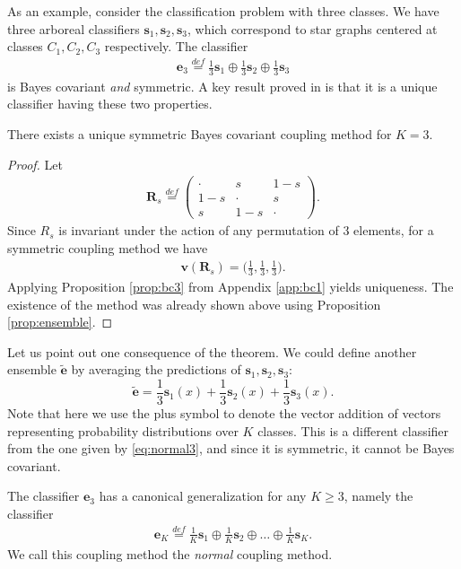 As an example, consider the classification problem with three classes. We have three arboreal classifiers $\boldsymbol{s}_1, \boldsymbol{s}_2, \boldsymbol{s}_3$, which correspond to star graphs centered  at classes $C_1, C_2, C_3$ respectively. The classifier 
\begin{align}
\boldsymbol{e}_3 \stackrel{def}{=} \frac13 \boldsymbol{s}_1 \oplus \frac13 \boldsymbol{s}_2 \oplus \frac 13 \boldsymbol{s}_3  \label{eq:normal3}
\end{align}
is Bayes covariant \emph{and} symmetric. A key result proved in \cite{vsuch2016bayes} is that it is a unique  classifier having these two properties.

\begin{thm} \label{thm:K3}
	There exists a unique symmetric Bayes covariant coupling method for $K=3$.
\end{thm}

\begin{proof}
Let 
\begin{align}
	\boldsymbol{R}_s \stackrel{def}{=} \begin{pmatrix} \cdot & s & 1 -s \\  1-s & \cdot & s \\ s & 1-s & \cdot \end{pmatrix}.
\end{align}
Since $R_s$ is invariant under the action of any permutation of 3 elements, 
for a symmetric coupling method we have 
\begin{align}
	\boldsymbol{v} (\boldsymbol{R}_s) = \biggl(\frac 13, \frac 13, \frac 13 \biggr).
\end{align}
Applying  Proposition \ref{prop:bc3} from Appendix \ref{app:bc1} yields uniqueness. The existence of the method was already shown above using Proposition \ref{prop:ensemble}.
\end{proof}


Let us point out one consequence of the theorem. We could define another ensemble $\tilde{\boldsymbol{e}}$ by averaging the predictions of $\boldsymbol{s}_1, \boldsymbol{s}_2, \boldsymbol{s}_3$:
\[
\tilde{\boldsymbol{e}} = \frac13 \boldsymbol{s}_1(x) + \frac13 \boldsymbol{s}_2(x) + \frac 13 \boldsymbol{s}_3(x).
\]
Note that here we use the plus symbol to denote the vector addition of vectors representing  probability distributions over $K$ classes. This is a different classifier from the one given by  \eqref{eq:normal3}, and since it is symmetric, it cannot be Bayes covariant.

The classifier $\boldsymbol{e}_3$ has a canonical generalization for any $K\geq 3$, namely the classifier
\begin{align}
\boldsymbol{e}_K \stackrel{def}{=} \frac1K \boldsymbol{s}_1 \oplus \frac1K \boldsymbol{s}_2 \oplus \ldots \oplus \frac 1K \boldsymbol{s}_K.  \label{eq:bc1}
\end{align}
We call this coupling method the \emph{normal} coupling method.


